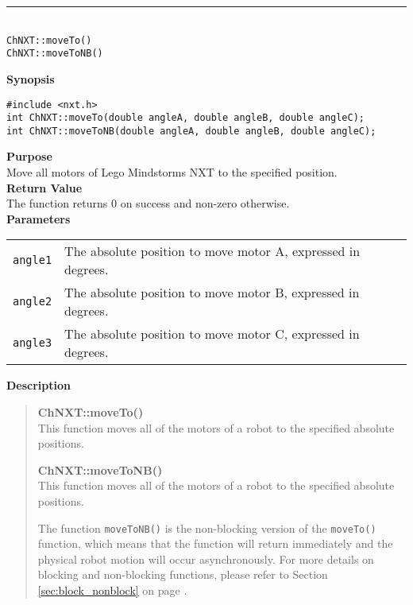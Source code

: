 \noindent
\vspace{5pt}
\rule{4.5in}{0.015in}\\
\noindent
{\LARGE \texttt{ChNXT::moveTo()} }\\
{\LARGE \texttt{ChNXT::moveToNB()} }\\


\noindent
{\bf Synopsis}
\begin{lstlisting}
#include <nxt.h>
int ChNXT::moveTo(double angleA, double angleB, double angleC);
int ChNXT::moveToNB(double angleA, double angleB, double angleC);
\end{lstlisting}

\noindent
{\bf Purpose}\\
Move all motors of Lego Mindstorms NXT to the specified position.\\

\noindent
{\bf Return Value}\\
The function returns 0 on success and non-zero otherwise.\\

\noindent
{\bf Parameters}\\
\vspace{-0.1in}
\begin{description}
\item               
\begin{tabular}{p{15 mm}p{105 mm}}
\texttt{angle1} & The absolute position to move motor A, expressed in degrees. \\
\texttt{angle2} & The absolute position to move motor B, expressed in degrees. \\
\texttt{angle3} & The absolute position to move motor C, expressed in degrees. \\
\end{tabular}
\end{description}

\noindent
{\bf Description}\\
\vspace{-12pt}
\begin{quote}
{\bf ChNXT::moveTo()}\\
This function moves all of the motors of a robot to the specified 
absolute positions. 

{\bf ChNXT::moveToNB()}\\
This function moves all of the motors of a robot to the specified 
absolute positions. 

The function \texttt{moveToNB()} is the non-blocking version of
the \texttt{moveTo()} function, which means that the function will
return immediately and the physical robot motion will occur 
asynchronously. For more details on blocking and non-blocking 
functions, please refer to Section \ref{sec:block_nonblock} on page 
\pageref{sec:block_nonblock}.\\
\end{quote}

